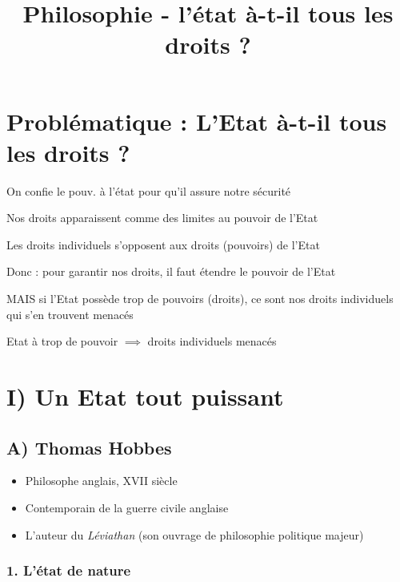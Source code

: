 \documentclass[
]{scrartcl}
\title{Philosophie - l'état à-t-il tous les droits ?}
\author{}
\date{}
\providecommand{\tightlist}{%
  \setlength{\itemsep}{0pt}\setlength{\parskip}{0pt}}
\begin{document}
\maketitle

\hypertarget{probluxe9matique-letat-uxe0-t-il-tous-les-droits}{%
\section{Problématique : L'Etat à-t-il tous les droits
?}\label{probluxe9matique-letat-uxe0-t-il-tous-les-droits}}

On confie le pouv. à l'état pour qu'il assure notre sécurité

Nos droits apparaissent comme des limites au pouvoir de l'Etat

Les droits individuels s'opposent aux droits (pouvoirs) de l'Etat

Donc : pour garantir nos droits, il faut étendre le pouvoir de l'Etat

MAIS si l'Etat possède trop de pouvoirs (droits), ce sont nos droits
individuels qui s'en trouvent menacés

Etat à trop de pouvoir \(\implies\) droits individuels menacés

\hypertarget{i-un-etat-tout-puissant}{%
\section{I) Un Etat tout puissant}\label{i-un-etat-tout-puissant}}

\hypertarget{a-thomas-hobbes}{%
\subsection{A) Thomas Hobbes}\label{a-thomas-hobbes}}

\begin{itemize}
\tightlist
\item
  Philosophe anglais, XVII siècle
\item
  Contemporain de la guerre civile anglaise
\item
  L'auteur du \emph{Léviathan} (son ouvrage de philosophie politique
  majeur)
\end{itemize}

\hypertarget{luxe9tat-de-nature}{%
\subsubsection{1. L'état de nature}\label{luxe9tat-de-nature}}
\end{document}

